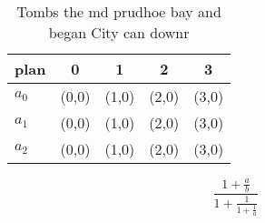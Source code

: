 \documentclass[a4paper]{article}
\begin{document}
\begin{table}
\begin{adjustbox}{width=0.6\columnwidth}
\begin{tabular}{|l|l|l|l|l|}
\hline
\textbf{plan} & \multicolumn{1}{c|}{\textbf{0}} & \multicolumn{1}{c|}{\textbf{1}} & \multicolumn{1}{c|}{\textbf{2}} & \multicolumn{1}{c|}{\textbf{3}} \\ \hline
\textbf{$a_0$}  & (0,0) & (1,0) & (2,0) & (3,0) \\ \hline
\textbf{$a_1$}  & (0,0) & (1,0) & (2,0) & (3,0) \\ \hline
\textbf{$a_2$}  & (0,0) & (1,0) & (2,0) & (3,0) \\ \hline
\end{tabular}
\end{adjustbox}
\caption{Tombs the md prudhoe bay and began City can downr
}
\end{table}

\[ \frac{1+\frac{a}{b}}{1+\frac{1}{1+\frac{1}{a}}} \]
\end{document}
